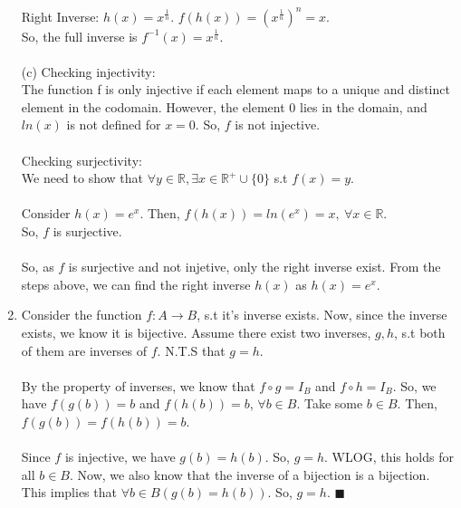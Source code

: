 \documentclass[a4paper]{article}
\begin{document}
\begin{enumerate}
Right Inverse: $h(x) = x^{\frac{1}{n}}$. $f(h(x)) = (x^\frac{1}{n})^n = x$.\\
So, the full inverse is $f^{-1}(x) = x^{\frac{1}{n}}$.\\
\\
(c) Checking injectivity:\\
The function f is only injective if each element maps to a unique and distinct element in the codomain. However, the element 0 lies in the domain, and $ln(x)$ is not defined for $x = 0$. So, $f$ is not injective.\\
\\
Checking surjectivity:\\
We need to show that $\forall y \in \mathbb{R}, \exists x \in \mathbb{R^+} \cup \{0\}$ s.t $f(x) = y$.\\
\\
Consider $h(x) = e^x$. Then, $f(h(x)) = ln(e^x) = x,\ \forall x \in \mathbb{R}$.\\
So, $f$ is surjective.\\
\\
So, as $f$ is surjective and not injetive, only the right inverse exist. From the steps above, we can find the right inverse $h(x)$ as $h(x) = e^x$.\\

\item Consider the function $f: A \rightarrow B$, s.t it's inverse exists. Now, since the inverse exists, we know it is bijective. Assume there exist two inverses, $g, h$, s.t both of them are inverses of $f$. N.T.S that $g = h$.\\
\\
By the property of inverses, we know that $f \circ g = I_B$ and $f \circ h = I_B$. So, we have $f(g(b)) = b$ and $f(h(b)) = b$, $\forall b \in B$. Take some $b \in B$. Then, $f(g(b)) = f(h(b)) = b$.\\
\\
Since $f$ is injective, we have $g(b) = h(b)$. So, $g = h$. WLOG, this holds for all $b \in B$. Now, we also know that the inverse of a bijection is a bijection. This implies that $\forall b \in B (g(b)=h(b))$. So, $g = h$. $\blacksquare$
\end{enumerate}
\end{document}

